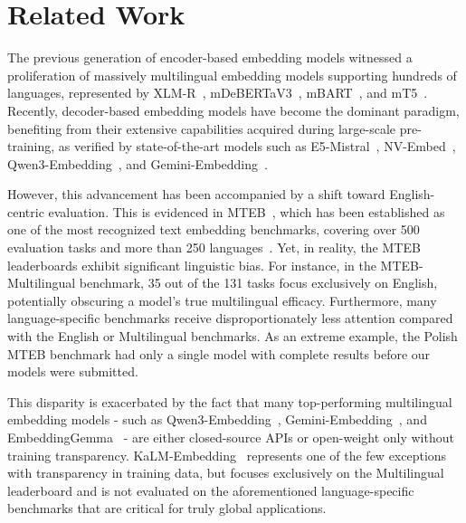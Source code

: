 \section{Related Work}

The previous generation of encoder-based embedding models witnessed a proliferation of massively multilingual embedding models supporting hundreds of languages, represented by XLM-R~\citep{2020XLM-R}, mDeBERTaV3~\citep{2023DebertaV3}, mBART~\citep{2020mBART}, and mT5~\citep{2021mT5}. Recently, decoder-based embedding models have become the dominant paradigm, benefiting from their extensive capabilities acquired during large-scale pre-training, as verified by state-of-the-art models such as E5-Mistral~\citep{2024E5-Mistral}, NV-Embed~\citep{2025NV-Embed}, Qwen3-Embedding~\citep{2025Qwen3-Embedding}, and Gemini-Embedding~\citep{2025Gemini-Embedding}.

However, this advancement has been accompanied by a shift toward English-centric evaluation. This is evidenced in MTEB~\citep{2023MTEB}, which has been established as one of the most recognized text embedding benchmarks, covering over 500 evaluation tasks and more than 250 languages~\citep{2025MMTEB}. Yet, in reality, the MTEB leaderboards exhibit significant linguistic bias. For instance, in the MTEB-Multilingual benchmark, 35 out of the 131 tasks focus exclusively on English, potentially obscuring a model's true multilingual efficacy. Furthermore, many language-specific benchmarks receive disproportionately less attention compared with the English or Multilingual benchmarks. As an extreme example, the Polish MTEB benchmark had only a single model with complete results before our models were submitted.

This disparity is exacerbated by the fact that many top-performing multilingual embedding models - such as Qwen3-Embedding~\citep{2025Qwen3-Embedding}, Gemini-Embedding~\citep{2025Gemini-Embedding}, and EmbeddingGemma~\citep{2025EmbeddingGemma} - are either closed-source APIs or open-weight only without training transparency. KaLM-Embedding~\citep{2025KaLM-Embedding-V2} represents one of the few exceptions with transparency in training data, but focuses exclusively on the Multilingual leaderboard and is not evaluated on the aforementioned language-specific benchmarks that are critical for truly global applications.